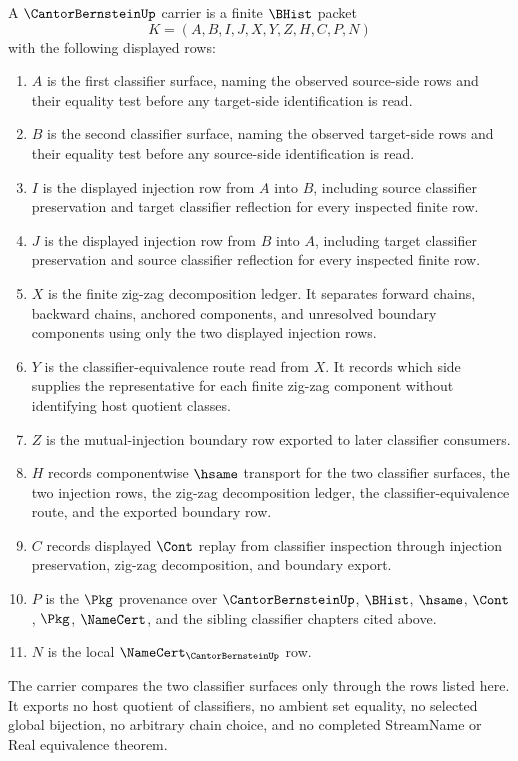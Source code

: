 \begin{definition}
\label{def:cantor-bernstein-carrier}
A $\CantorBernsteinUp$ carrier is a finite $\BHist$ packet
$$
K=(A,B,I,J,X,Y,Z,H,C,P,N)
$$
with the following displayed rows:
\begin{enumerate}
\item $A$ is the first classifier surface, naming the observed source-side rows and their equality test before any target-side identification is read.
\item $B$ is the second classifier surface, naming the observed target-side rows and their equality test before any source-side identification is read.
\item $I$ is the displayed injection row from $A$ into $B$, including source classifier preservation and target classifier reflection for every inspected finite row.
\item $J$ is the displayed injection row from $B$ into $A$, including target classifier preservation and source classifier reflection for every inspected finite row.
\item $X$ is the finite zig-zag decomposition ledger. It separates forward chains, backward chains, anchored components, and unresolved boundary components using only the two displayed injection rows.
\item $Y$ is the classifier-equivalence route read from $X$. It records which side supplies the representative for each finite zig-zag component without identifying host quotient classes.
\item $Z$ is the mutual-injection boundary row exported to later classifier consumers.
\item $H$ records componentwise $\hsame$ transport for the two classifier surfaces, the two injection rows, the zig-zag decomposition ledger, the classifier-equivalence route, and the exported boundary row.
\item $C$ records displayed $\Cont$ replay from classifier inspection through injection preservation, zig-zag decomposition, and boundary export.
\item $P$ is the $\Pkg$ provenance over $\CantorBernsteinUp$, $\BHist$, $\hsame$, $\Cont$, $\Pkg$, $\NameCert$, and the sibling classifier chapters cited above.
\item $N$ is the local $\NameCert_{\CantorBernsteinUp}$ row.
\end{enumerate}
The carrier compares the two classifier surfaces only through the rows listed here. It exports no host quotient of classifiers, no ambient set equality, no selected global bijection, no arbitrary chain choice, and no completed StreamName or Real equivalence theorem.
\end{definition}


